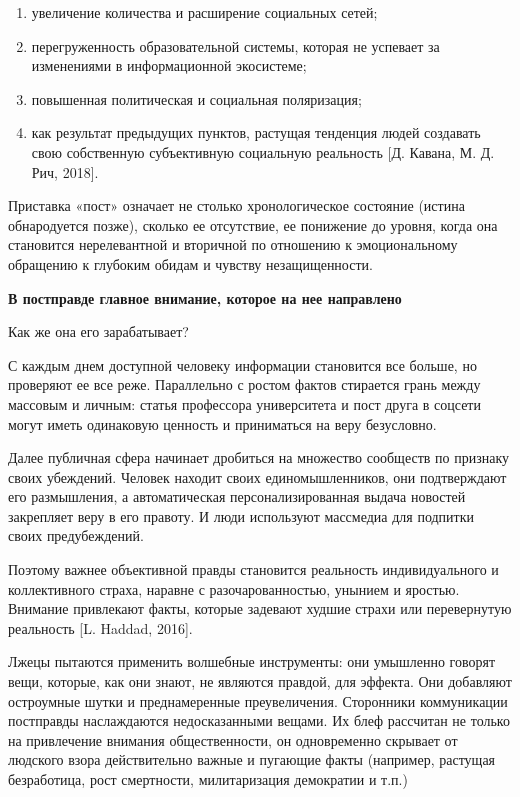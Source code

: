 \begin{enumerate}
    \item увеличение количества и расширение социальных сетей;
    \item перегруженность образовательной системы, которая не успевает за изменениями в информационной экосистеме;
    \item повышенная политическая и социальная поляризация;
    \item как результат предыдущих пунктов, растущая тенденция людей создавать свою собственную субъективную социальную реальность [Д. Кавана, М. Д. Рич, 2018].
\end{enumerate}

Приставка «пост» означает не столько хронологическое состояние (истина обнародуется позже), сколько ее отсутствие, ее понижение до уровня, когда она становится нерелевантной и вторичной по отношению к эмоциональному обращению к глубоким обидам и чувству незащищенности.

\textbf{В постправде главное внимание, которое на нее направлено}

Как же она его зарабатывает?

С каждым днем доступной человеку информации становится все больше, но проверяют ее все реже. Параллельно с ростом фактов стирается грань между массовым и личным: статья профессора университета и пост друга в соцсети могут иметь одинаковую ценность и приниматься на веру безусловно.

Далее публичная сфера начинает дробиться на множество сообществ по признаку своих убеждений. Человек находит своих единомышленников, они подтверждают его размышления, а автоматическая персонализированная выдача новостей закрепляет веру в его правоту. И люди используют массмедиа для подпитки своих предубеждений.

Поэтому важнее объективной правды становится реальность индивидуального и коллективного страха, наравне с разочарованностью, унынием и яростью. Внимание привлекают факты, которые задевают худшие страхи или перевернутую реальность [L. Haddad, 2016].

Лжецы пытаются применить волшебные инструменты: они умышленно говорят вещи, которые, как они знают, не являются правдой, для эффекта. Они добавляют остроумные шутки и преднамеренные преувеличения. Сторонники коммуникации постправды наслаждаются недосказанными вещами. Их блеф рассчитан не только на привлечение внимания общественности, он одновременно скрывает от людского взора действительно важные и пугающие факты (например, растущая безработица, рост смертности, милитаризация демократии и т.п.)

